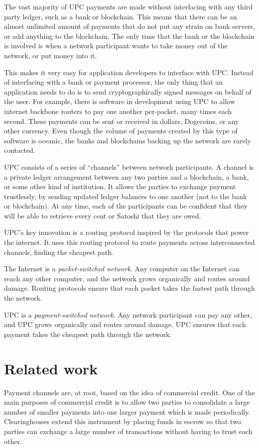 \documentclass[a4paper]{article}
\begin{document}
The vast majority of UPC payments are made without interfacing with any third party ledger, such as a bank or blockchain. This means that there can be an almost unlimited amount of payments that do not put any strain on bank servers, or add anything to the blockchain. The only time that the bank or the blockchain is involved is when a network participant wants to take money out of the network, or put money into it.

This makes it very easy for application developers to interface with UPC. Instead of interfacing with a bank or payment processor, the only thing that an application needs to do is to send cryptographically signed messages on behalf of the user. For example, there is software in development using UPC to allow internet backbone routers to pay one another per-packet, many times each second. These payments can be sent or received in dollars, Dogecoins, or any other currency. Even though the volume of payments created by this type of software is oceanic, the banks and blockchains backing up the network are rarely contacted.

UPC consists of a series of ``channels'' between network participants. A channel is a private ledger arrangement between any two parties and a blockchain, a bank, or some other kind of institution. It allows the parties to exchange payment trustlessly, by sending updated ledger balances to one another (not to the bank or blockchain). At any time, each of the participants can be confident that they will be able to retrieve every cent or Satoshi that they are owed.

UPC's key innovation is a routing protocol inspired by the protocols that power the internet. It uses this routing protocol to route payments across interconnected channels, finding the cheapest path.

The Internet is a \emph{packet-switched network}. Any computer on the Internet can reach any other computer, and the network grows organically and routes around damage. Routing protocols ensure that each packet takes the fastest path through the network.

UPC is a \emph{payment-switched network}. Any network participant can pay any other, and UPC grows organically and routes around damage. UPC ensures that each payment takes the cheapest path through the network.

\section*{Related work}
Payment channels are, at root, based on the idea of commercial credit. One of the main purposes of commercial credit is to allow two parties to consolidate a large number of smaller payments into one larger payment which is made periodically. Clearinghouses extend this instrument by placing funds in escrow so that two parties can exchange a large number of transactions without having to trust each other.
\end{document}
